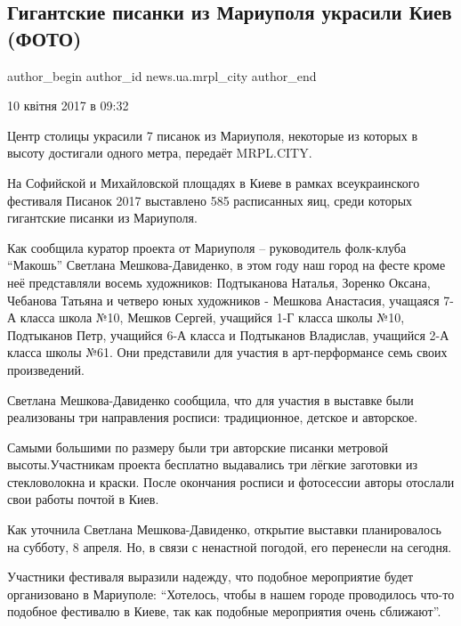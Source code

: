  
 
 
 
 
 
\subsection{Гигантские писанки из Мариуполя украсили Киев (ФОТО)}
\label{sec:10_04_2017.stz.news.ua.mrpl_city.1.gigantskie_pysanki_iz_mariupolja_ukrasili_kiev}
 
\ifcmt
 author_begin
   author_id news.ua.mrpl_city
 author_end
\fi

10 квітня 2017 в 09:32

Центр столицы украсили 7 писанок из Мариуполя, некоторые из которых в высоту
достигали одного метра, передаёт MRPL.CITY.

На Софийской и Михайловской площадях в Киеве в рамках всеукраинского фестиваля
Писанок 2017 выставлено 585 расписанных яиц, среди которых гигантские писанки
из Мариуполя.


Как сообщила куратор проекта от Мариуполя – руководитель фолк-клуба \enquote{Макошь}
Светлана Мешкова-Давиденко, в этом году наш город на фесте кроме неё
представляли восемь художников: Подтыканова Наталья, Зоренко Оксана, Чебанова
Татьяна и четверо юных художников - Мешкова Анастасия, учащаяся 7-А класса
школа №10, Мешков Сергей, учащийся 1-Г класса школы №10, Подтыканов Петр,
учащийся 6-А класса и Подтыканов Владислав, учащийся 2-А класса  школы №61. Они
представили для участия в арт-перформансе семь своих произведений.

Светлана Мешкова-Давиденко сообщила, что для участия в выставке были
реализованы три направления росписи: традиционное, детское и авторское.

Самыми большими по размеру были три авторские писанки метровой
высоты.Участникам проекта бесплатно выдавались три лёгкие заготовки из
стекловолокна и краски. После окончания росписи и фотосессии авторы отослали
свои работы почтой в Киев.


Как уточнила Светлана Мешкова-Давиденко, открытие выставки планировалось на
субботу, 8 апреля. Но, в связи с ненастной погодой, его перенесли на сегодня.

Участники фестиваля выразили надежду, что подобное мероприятие будет
организовано в Мариуполе: \enquote{Хотелось, чтобы в нашем городе проводилось что-то
подобное фестивалю в Киеве, так как подобные мероприятия очень сближают}.
